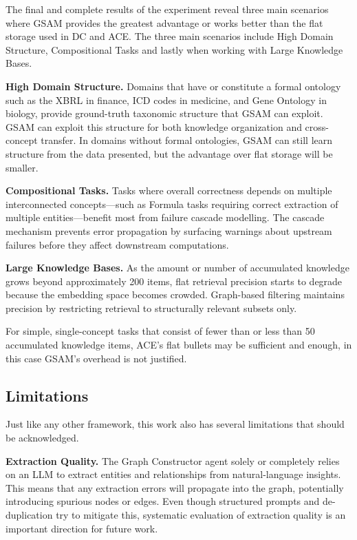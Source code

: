 \documentclass[12pt,a4paper,oneside]{article}
\begin{document}
The final and complete results of the experiment reveal three main scenarios where GSAM provides the greatest advantage or works better than the flat storage used in DC and ACE. The three main scenarios include High Domain Structure, Compositional Tasks and lastly when working with Large Knowledge Bases.

\textbf{High Domain Structure.} Domains that have or constitute a formal ontology such as the XBRL in finance, ICD codes in medicine, and Gene Ontology in biology, provide ground-truth taxonomic structure that GSAM can exploit. GSAM can exploit this structure for both knowledge organization and cross-concept transfer. In domains without formal ontologies, GSAM can still learn structure from the data presented, but the advantage over flat storage will be smaller.

\textbf{Compositional Tasks.} Tasks where overall correctness depends on multiple interconnected concepts---such as Formula tasks requiring correct extraction of multiple entities---benefit most from failure cascade modelling. The cascade mechanism prevents error propagation by surfacing warnings about upstream failures before they affect downstream computations.

\textbf{Large Knowledge Bases.} As the amount or number of accumulated knowledge grows beyond approximately 200 items, flat retrieval precision starts to degrade because the embedding space becomes crowded. Graph-based filtering maintains precision by restricting retrieval to structurally relevant subsets only.

For simple, single-concept tasks that consist of fewer than or less than 50 accumulated knowledge items, ACE's flat bullets may be sufficient and enough, in this case GSAM's overhead is not justified.

\subsection{Limitations}

Just like any other framework, this work also has several limitations that should be acknowledged.

\textbf{Extraction Quality.} The Graph Constructor agent solely or completely relies on an LLM to extract entities and relationships from natural-language insights. This means that any extraction errors will propagate into the graph, potentially introducing spurious nodes or edges. Even though structured prompts and de-duplication try to mitigate this, systematic evaluation of extraction quality is an important direction for future work.
\end{document}
